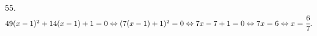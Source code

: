 55. $49(x-1)^2+14(x-1)+1=0\Leftrightarrow (7(x-1)+1)^2=0\Leftrightarrow 7x-7+1=0\Leftrightarrow 7x=6\Leftrightarrow x=\cfrac{6}{7}.$\\
